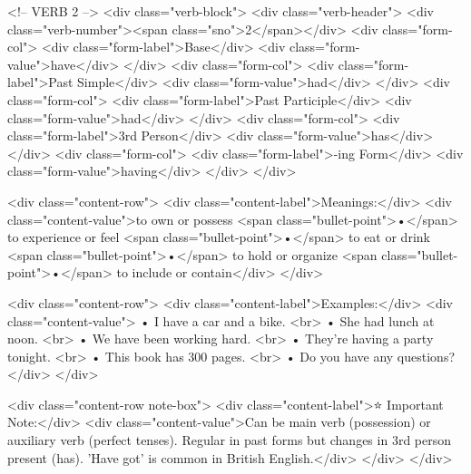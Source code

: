         <!-- VERB 2 -->
        <div class="verb-block">
            <div class="verb-header">
                <div class="verb-number"><span class="sno">2</span></div>
                <div class="form-col">
                    <div class="form-label">Base</div>
                    <div class="form-value">have</div>
                </div>
                <div class="form-col">
                    <div class="form-label">Past Simple</div>
                    <div class="form-value">had</div>
                </div>
                <div class="form-col">
                    <div class="form-label">Past Participle</div>
                    <div class="form-value">had</div>
                </div>
                <div class="form-col">
                    <div class="form-label">3rd Person</div>
                    <div class="form-value">has</div>
                </div>
                <div class="form-col">
                    <div class="form-label">-ing Form</div>
                    <div class="form-value">having</div>
                </div>
            </div>
            
            <div class="content-row">
                <div class="content-label">Meanings:</div>
                <div class="content-value">to own or possess <span class="bullet-point">•</span> to experience or feel <span class="bullet-point">•</span> to eat or drink <span class="bullet-point">•</span> to hold or organize <span class="bullet-point">•</span> to include or contain</div>
            </div>
            
            <div class="content-row">
                <div class="content-label">Examples:</div>
                <div class="content-value">
                    • I have a car and a bike. <br>
                    • She had lunch at noon. <br>
                    • We have been working hard. <br>
                    • They're having a party tonight. <br>
                    • This book has 300 pages. <br>
                    • Do you have any questions?
                </div>
            </div>
            
            <div class="content-row note-box">
                <div class="content-label">⭐ Important Note:</div>
                <div class="content-value">Can be main verb (possession) or auxiliary verb (perfect tenses). Regular in past forms but changes in 3rd person present (has). 'Have got' is common in British English.</div>
            </div>
        </div>
        
